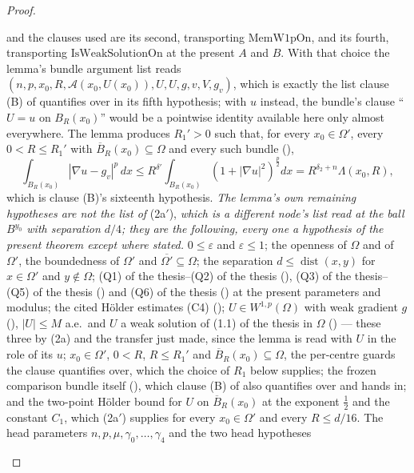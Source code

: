 \begin{proof}
\begin{enumerate}
  and the clauses used are its second, transporting $\mathrm{MemW1pOn}$, and its
  fourth, transporting $\mathrm{IsWeakSolutionOn}$ at the present $A$ and $B$.  With that
  choice the lemma's bundle argument list reads
  $(n,p,x_0,R,\mathcal A(x_0,U(x_0)),U,U,g,v,V,g_v)$, which is exactly the list
  clause (B) of  quantifies over in its
  fifth hypothesis; with $u$ instead, the bundle's clause ``$U=u$ on
  $B_R(x_0)$'' would be a pointwise identity available here only almost
  everywhere.  The lemma produces $R_1'>0$ such that, for every $x_0\in\Omega'$,
  every $0<R\le R_1'$ with $\overline B_R(x_0)\subseteq\Omega$ and every such
  bundle (),
  \[
  \int_{B_R(x_0)}|\nabla u-g_v|^p\,dx\le R^{\delta'}\!\int_{B_R(x_0)}
  (1+|\nabla u|^2)^{\frac p2}dx=R^{\delta_2+n}\Lambda(x_0,R),
  \]
  which is clause (B)'s sixteenth hypothesis.  \emph{The lemma's own remaining
  hypotheses are \textup{not} the list of} (2a$'$), \emph{which is a different
  node's list read at the ball $B^{y_0}$ with separation $d/4$; they are the
  following, every one a hypothesis of the present theorem except where stated.}
  $0\le\varepsilon$ and $\varepsilon\le1$; the openness of $\Omega$ and of
  $\Omega'$, the boundedness of $\Omega'$ and
  $\overline{\Omega'}\subseteq\Omega$; the separation
  $d\le\operatorname{dist}(x,y)$ for $x\in\Omega'$ and $y\notin\Omega$;
  (Q1) of the thesis--(Q2) of the thesis (),
  (Q3) of the thesis--(Q5) of the thesis () and
  (Q6) of the thesis () at the present parameters and
  modulus; the cited H\"older estimates (C4)
  (); $U\in W^{1,p}(\Omega)$ with weak gradient
  $g$ (), $|U|\le M$ a.e.\ and $U$ a weak solution of
  (1.1) of the thesis in $\Omega$ () --- these three by
  (2a) and the transfer just made, since the lemma is read with $U$ in the role
  of its $u$; $x_0\in\Omega'$, $0<R$, $R\le R_1'$ and
  $\overline B_R(x_0)\subseteq\Omega$, the per-centre guards the clause
  quantifies over, which the choice of $R_1$ below supplies; the frozen
  comparison bundle itself (), which clause (B) of
   also quantifies over and hands in; and
  the two-point H\"older bound for $U$ on $\overline B_R(x_0)$ at the exponent
  $\tfrac12$ and the constant $C_1$, which (2a$'$) supplies for every
  $x_0\in\Omega'$ and every $R\le d/16$.  The head parameters
  $n,p,\mu,\gamma_0,\dots,\gamma_4$ and the two head hypotheses

\end{enumerate}
\end{proof}
